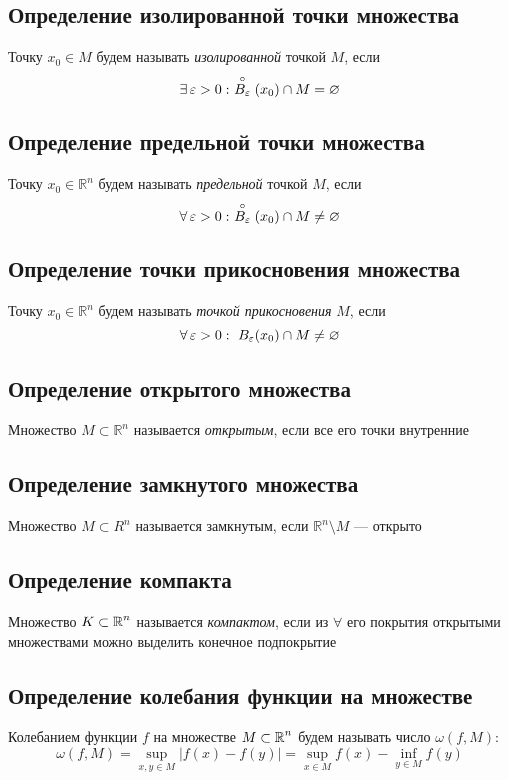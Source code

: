 \documentclass[a4paper]{article}
\begin{document}
\subsection{Определение изолированной точки множества}
 Точку $x_0\in M$ будем называть \textit{изолированной} точкой $M$, если $$\exists \ve>0:\ \stackrel{\circ}{B_{\ve}}(x_0)\cap M=\varnothing$$ 

\subsection{Определение предельной точки множества}
 Точку $x_0\in\mathbb{R}^n$ будем называть \textit{предельной} точкой $M$, если $$\forall \ve>0:\ \stackrel{\circ}{B_{\ve}}(x_0)\cap M\ne\varnothing$$ 

\subsection{Определение точки прикосновения множества}
 Точку $x_0\in\mathbb{R}^n$ будем называть \textit{точкой прикосновения} $M$, если $$\forall \operatorname{\varepsilon}>0:\ B_{\operatorname{\varepsilon}}(x_0)\cap M\ne\varnothing$$ 

\subsection{Определение открытого множества}
 Множество $M\subset\mathbb{R}^n$ называется \textit{открытым}, если все его точки внутренние

\subsection{Определение замкнутого множества}
 Множество $M\subset R^n$ называется замкнутым, если $\mathbb{R}^n\setminus M$ — открыто

\subsection{Определение компакта}
 Множество $K\subset\operatorname{\mathbb{R}}^n$ называется \textit{компактом}, если из $\forall$ его покрытия открытыми множествами можно выделить конечное подпокрытие

\subsection{Определение колебания функции на множестве}
 Колебанием функции $f$ на множестве $M\subset \operatorname{\mathbb{R}}^n$ будем называть число $\omega(f, M)$:
\begin{equation*}
    \omega(f, M) = \sup_{x, y\in M}|f(x) - f(y)| = \sup_{x\in M} f(x) - \inf_{y\in M} f(y)
\end{equation*}
\end{document}
